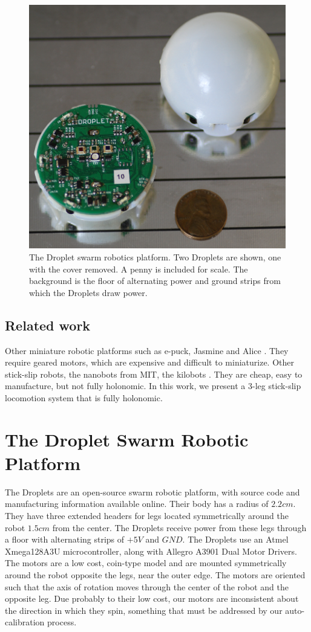 \documentclass[letterpaper, 10pt, conference]{ieeeconf}
\begin{document}
\begin{figure}[h]
	\centering
		\includegraphics[width=0.8\columnwidth]{./Images/droplets.png}
	\caption{The Droplet swarm robotics platform. Two Droplets are shown, one with the cover removed. A penny is included for scale. The background is the floor of alternating power and ground strips from which the Droplets draw power.}
	\label{droplets}
\end{figure}

\subsection{Related work}
Other miniature robotic platforms such as e-puck, Jasmine and Alice \cite{}. They require geared motors, which are expensive and difficult to miniaturize. Other stick-slip robots, the nanobots from MIT, the kilobots \cite{}. They are cheap, easy to manufacture, but not fully holonomic. In this work, we present a 3-leg stick-slip locomotion system that is fully holonomic. 



\section{The Droplet Swarm Robotic Platform}
The Droplets are an open-source swarm robotic platform, with source code and manufacturing information available online. Their body has a radius of $2.2cm$. They have three extended headers for legs located symmetrically around the robot $1.5cm$ from the center. The Droplets receive power from these legs through a floor with alternating strips of $+5V$ and $GND$. The Droplets use an Atmel Xmega128A3U microcontroller, along with Allegro A3901 Dual Motor Drivers. The motors are a low cost, coin-type model and are mounted symmetrically around the robot opposite the legs, near the outer edge. The motors are oriented such that the axis of rotation moves through the center of the robot and the opposite leg. Due probably to their low cost, our motors are inconsistent about the direction in which they spin, something that must be addressed by our auto-calibration process.
\end{document}
